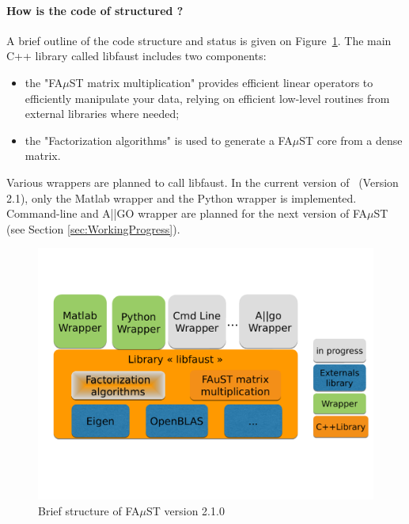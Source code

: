 \paragraph{How is the code of \FAuST structured ?}
A brief outline of the code structure and status is given on Figure~\ref{fig:faustStructure}. The main C++ library called \textrm{libfaust} includes two components:
\begin{itemize}
\item the "FA$\mu$ST matrix multiplication" provides efficient linear operators to efficiently manipulate your data, relying on efficient low-level routines from external libraries where needed; 
\item the "Factorization algorithms" is used to generate a FA$\mu$ST core from a dense matrix. 
\end{itemize}
Various wrappers are planned to call \textrm{libfaust}. In the current version of \FAuST\ (Version 2.1), only the Matlab wrapper and the Python wrapper is implemented. Command-line and A||GO wrapper are planned for the next version of FA$\mu$ST (see Section \ref{sec:WorkingProgress}).   


\begin{figure}[H] %
\centering
\includegraphics[scale=0.45,trim = 0cm 3cm 0cm 3cm, clip]{images/FaustStructure2-1.pdf}
\caption{Brief structure of FA$\mu$ST version 2.1.0}
\label{fig:faustStructure}
\end{figure}


